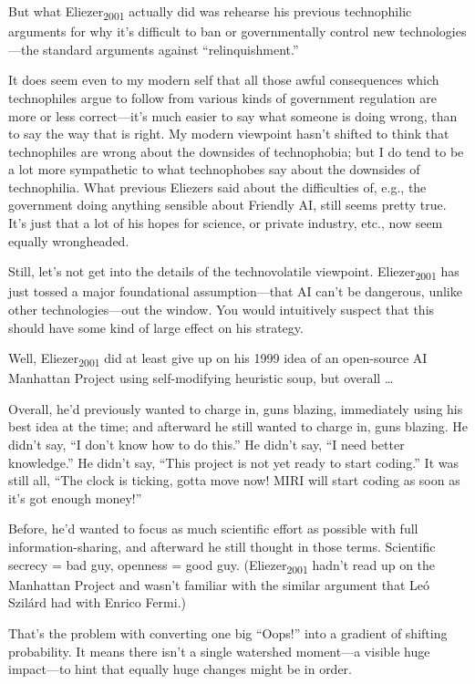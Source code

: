 {
 But what Eliezer\textsubscript{2001} actually did was rehearse his
previous technophilic arguments for why it's difficult
to ban or governmentally control new technologies---the standard
arguments against
``relinquishment.''}

{
 It does seem even to my modern self that all those awful
consequences which technophiles argue to follow from various kinds of
government regulation are more or less correct---it's
much easier to say what someone is doing wrong, than to say the way
that is right. My modern viewpoint hasn't shifted to
think that technophiles are wrong about the downsides of technophobia;
but I do tend to be a lot more sympathetic to what technophobes say
about the downsides of technophilia. What previous Eliezers said about
the difficulties of, e.g., the government doing anything sensible about
Friendly AI, still seems pretty true. It's just that a
lot of his hopes for science, or private industry, etc., now seem
equally wrongheaded.}

{
 Still, let's not get into the details of the
technovolatile viewpoint. Eliezer\textsubscript{2001} has just tossed a
major foundational assumption---that AI can't be
dangerous, unlike other technologies---out the window. You would
intuitively suspect that this should have some kind of large effect on
his strategy.}

{
 Well, Eliezer\textsubscript{2001} did at least give up on his 1999
idea of an open-source AI Manhattan Project using self-modifying
heuristic soup, but overall \ldots}

{
 Overall, he'd previously wanted to charge in, guns
blazing, immediately using his best idea at the time; and afterward he
still wanted to charge in, guns blazing. He didn't say,
``I don't know how to do
this.'' He didn't say,
``I need better knowledge.'' He
didn't say, ``This project is not yet
ready to start coding.'' It was still all,
``The clock is ticking, gotta move now! MIRI will
start coding as soon as it's got enough
money!''}

{
 Before, he'd wanted to focus as much scientific
effort as possible with full information-sharing, and afterward he
still thought in those terms. Scientific secrecy = bad guy, openness =
good guy. (Eliezer\textsubscript{2001} hadn't read up
on the Manhattan Project and wasn't familiar with the
similar argument that Leó Szilárd had with Enrico Fermi.)}

{
 That's the problem with converting one big
``Oops!'' into a gradient of
shifting probability. It means there isn't a single
watershed moment---a visible huge impact---to hint that equally huge
changes might be in order.}

